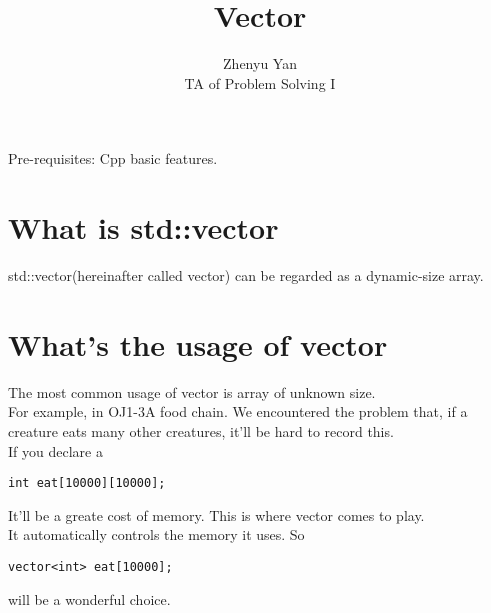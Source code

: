 \documentclass{article}
\title{Vector}
\author{Zhenyu Yan\\TA of Problem Solving I}
\date{}
\begin{document}
\maketitle
Pre-requisites: Cpp basic features.
\section{What is std::vector}
std::vector(hereinafter called vector) can be regarded as a dynamic-size array.\\
\section{What's the usage of vector}
The most common usage of vector is array of unknown size.\\
For example, in OJ1-3A food chain. We encountered the problem that, if a creature eats many other creatures, it'll be hard to record this.\\
If you declare a \begin{lstlisting}
int eat[10000][10000];\end{lstlisting}
It'll be a greate cost of memory. This is where vector comes to play.\\
It automatically controls the memory it uses. So\begin{lstlisting}
vector<int> eat[10000];\end{lstlisting}
will be a wonderful choice.
\newpage
\end{document}
